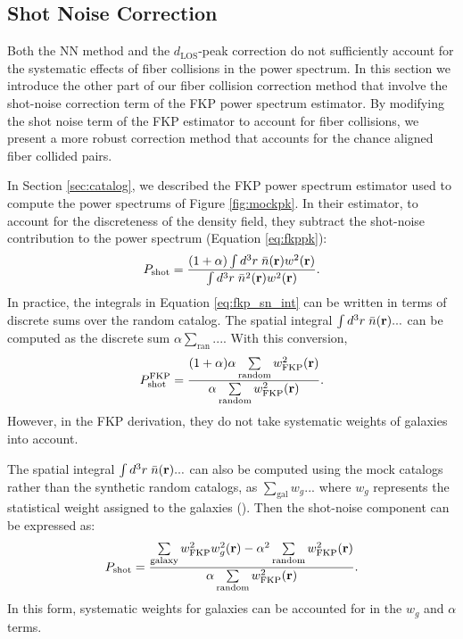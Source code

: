 \documentclass{emulateapj}
\begin{document}
\subsection{Shot Noise Correction} \label{sec:shotnoise} 
Both the NN method and the $d_\mathrm{LOS}$-peak correction do not sufficiently account for the systematic effects of fiber collisions in the power spectrum. In this section we introduce the other part of our fiber collision correction method that involve the shot-noise correction term of the FKP power spectrum estimator. By modifying the shot noise term of the FKP estimator to account for fiber collisions, we present a more robust correction method that accounts for the chance aligned fiber collided pairs. 

In Section \ref{sec:catalog}, we described the FKP power spectrum estimator used to compute the power spectrums of Figure \ref{fig:mockpk}. In their estimator, to account for the discreteness of the density field, they subtract the shot-noise contribution to the power spectrum (Equation \ref{eq:fkppk}): 
\begin{equation} \label{eq:fkp_sn_int}
P_\mathrm{shot} = \frac{ (1+\alpha) \int d^3r \;\bar{n}({\bf r})w^2({\bf r})}{\int d^3r \;\bar{n}^2({\bf r})w^2({\bf r})}. 
\end{equation}
In practice, the integrals in Equation \ref{eq:fkp_sn_int} can be written in terms of discrete sums over the random catalog. The spatial integral $\int d^3r \; \bar{n}({\bf r}) ...$ can be computed as the discrete sum $\alpha \sum_{\mathrm{ran}}...$. With this conversion,
\begin{equation} \label{eq:fkp_shotnoise}
P^\mathrm{FKP}_\mathrm{shot} = \frac{(1+\alpha) \alpha \sum\limits_{\mathrm{random}} w_\mathrm{FKP}^2({\bf r})}{\alpha \sum\limits_{\mathrm{random}}w_\mathrm{FKP}^2({\bf r})}.
\end{equation} 
However, in the FKP derivation, they do not take systematic weights of galaxies into account.

The spatial integral $\int d^3r \;\bar{n}({\bf r})...$ can also be computed using the mock catalogs rather than the synthetic random catalogs, as $\sum_{\mathrm{gal}} w_g...$ where $w_g$ represents the statistical weight assigned to the galaxies (\citealt{Cole:2005aa, Yamamoto:2006aa, Beutler:2014aa, Gil-Marin:2014aa}). Then the shot-noise component can be expressed as: 
\begin{equation} \label{eq:fkpweight}
P_\mathrm{shot} = \frac{ \sum\limits_{\mathrm{galaxy}} w^2_\mathrm{FKP}w^2_g({\bf r})- \alpha^2 \sum\limits_{\mathrm{random}} w_\mathrm{FKP}^2({\bf r})}{\alpha \sum\limits_{\mathrm{random}}w_\mathrm{FKP}^2({\bf r})}.
\end{equation}
In this form, systematic weights for galaxies can be accounted for in the $w_g$ and $\alpha$ terms. 
\end{document}
